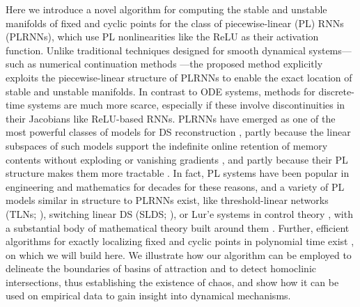 \documentclass{article}
\theoremstyle{example}
\theoremstyle{plain}
\theoremstyle{definition}
\theoremstyle{remark}
\begin{document}
Here we introduce a novel algorithm for computing the stable and unstable manifolds of fixed and cyclic points for the class of piecewise-linear (PL) RNNs (PLRNNs), which use PL nonlinearities like the ReLU as their activation function. Unlike traditional techniques designed for smooth dynamical systems—such as numerical continuation methods 
\citep{krauskopf2007numerical} —the proposed method explicitly exploits the piecewise-linear structure of %
PLRNNs to enable the exact location of stable and unstable manifolds. In contrast to ODE systems, methods for discrete-time systems are much more scarce, especially if these involve discontinuities in their Jacobians like ReLU-based RNNs. PLRNNs have emerged as one of the most powerful classes of models for DS reconstruction \citep{hess,brenner_tractable_2022,brennerintegrating,nassartree}, partly because the linear subspaces of such models support the indefinite online retention of memory contents without exploding or vanishing gradients \citep{sch,orvieto2023resurrecting,gu2023mamba}, and partly because their PL structure makes them more tractable \citep{coombes2024osc}. In fact, PL systems have been popular in engineering \citep{bemporad2000piecewise,carmona2002simplifying,storace2004piecewise} and mathematics \citep{alligood1996,avrutin_continuous_2019,coombes2024osc,simpson2023compute} for decades for these reasons, and a variety of PL models similar in structure to PLRNNs exist, like threshold-linear networks (TLNs; \cite{curto2023graph,parmelee2022core,morrison2016diversity,hahnloser2000permitted}), switching linear DS (SLDS; \cite{linderman_recurrent_2016,linderman_bayesian_2017}), or Lur'e systems in control theory \citep{su2023necessity,waitman2017incremental,bill2016stability}, with a substantial body of mathematical theory built around them \citep{parmelee2022core,morrison2016diversity,brenner2024alrnn,avrutin_continuous_2019,amaral_piecewise_2006,simpson2023compute,coombes2024osc,casdagli1989nonlinear,ives2012detecting,costa2019adaptive}.
Further, efficient algorithms for exactly localizing fixed and cyclic points in polynomial time exist \citep{eisenmann_bifurcations_2023}, on which we will build here. We illustrate how our algorithm can be employed to delineate the boundaries of basins of attraction and to detect homoclinic intersections, thus establishing the existence of chaos, and show how it can be used on empirical data to gain insight into dynamical mechanisms.

\end{document}

